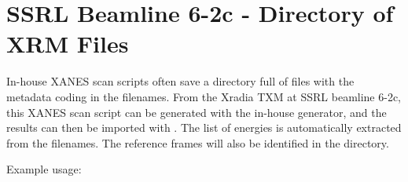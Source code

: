 \documentclass[letterpaper,10pt,english]{sphinxmanual}
\begin{document}
\begin{sphinxVerbatim}[commandchars=\\\{\}]
   

\end{sphinxVerbatim}


\section{SSRL Beamline 6-2c - Directory of XRM Files}
\label{\detokenize{importing:ssrl-beamline-6-2c-directory-of-xrm-files}}
In-house XANES scan scripts often save a directory full of 
files with the metadata coding in the filenames. From the Xradia TXM
at SSRL beamline 6-2c, this XANES scan script can be generated with
the in-house generator, and the results can then be imported with
{\hyperref[\detokenize{xanespy:xanespy.importers.import_ssrl_xanes_dir}]{}}. The list of
energies is automatically extracted from the filenames. The reference
frames will also be identified in the directory.

Example usage:

\begin{sphinxVerbatim}[commandchars=\\\{\}]
   

\end{sphinxVerbatim}
\end{document}
